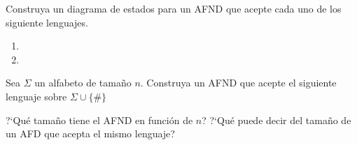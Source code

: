 \documentclass[dcc]{fcfmcourse}
\begin{document}
\begin{problems}
\problem Construya un diagrama de estados para un AFND que acepte cada uno de los siguiente lenguajes.

\begin{enumerate}
\item {}
\item {}
\end{enumerate}

\problem Sea $\Sigma$ un alfabeto de tamaño $n$. Construya un AFND que acepte el siguiente lenguaje sobre $\Sigma\cup \{\#\}$

\begin{center}
\end{center}

?`Qué tamaño tiene el AFND en función de $n$? ?`Qué puede decir del tamaño de un AFD que acepta el mismo lenguaje?

\end{problems}
\end{document}
